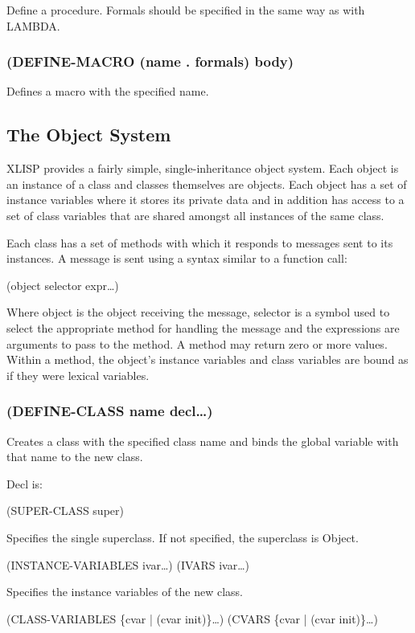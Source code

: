 \documentclass[11pt]{article}
\begin{document}
Define a procedure.  Formals should be specified in the same way as
with LAMBDA.
\subsubsection{(DEFINE-MACRO (name . formals) body)}
\label{sec-4-10-3}

Defines a macro with the specified name.
\subsection{The Object System}
\label{sec-4-11}

XLISP provides a fairly simple, single-inheritance object system.
Each object is an instance of a class and classes themselves are
objects.  Each object has a set of instance variables where it stores
its private data and in addition has access to a set of class
variables that are shared amongst all instances of the same class.

Each class has a set of methods with which it responds to messages
sent to its instances.  A message is sent using a syntax similar to a
function call:

(object selector expr\ldots{})

Where object is the object receiving the message, selector is a
symbol used to select the appropriate method for handling the message
and the expressions are arguments to pass to the method.  A method
may return zero or more values.  Within a method, the object's
instance variables and class variables are bound as if they were
lexical variables.

\subsubsection{(DEFINE-CLASS name decl\ldots{})}
\label{sec-4-11-1}

Creates a class with the specified class name and binds the global
variable with that name to the new class.

Decl is:

(SUPER-CLASS super)

Specifies the single superclass.  If not specified, the superclass
is Object.

(INSTANCE-VARIABLES ivar\ldots{})
(IVARS ivar\ldots{})

Specifies the instance variables of the new class.

(CLASS-VARIABLES \{cvar | (cvar init)\}\ldots{})
(CVARS \{cvar | (cvar init)\}\ldots{})
\end{document}
